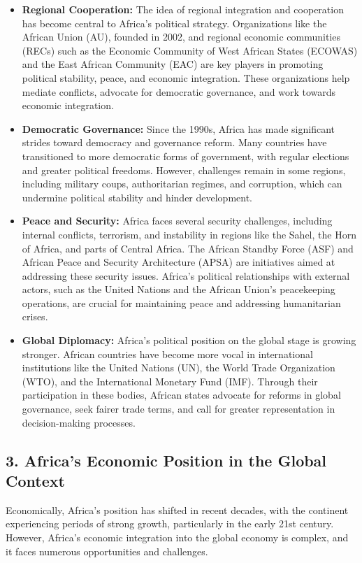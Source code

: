\documentclass[10pt]{article}
\begin{document}
\begin{itemize}
  \item \textbf{Regional Cooperation:} The idea of regional integration and cooperation has become
    central to Africa's political strategy. Organizations like the African Union (AU), founded in
    2002, and regional economic communities (RECs) such as the Economic Community of
    West African States (ECOWAS) and the East African Community (EAC) are key players in
    promoting political stability, peace, and economic integration. These organizations help
    mediate conflicts, advocate for democratic governance, and work towards economic
    integration.

  \item \textbf{Democratic Governance:} Since the 1990s, Africa has made significant strides toward
    democracy and governance reform. Many countries have transitioned to more
    democratic forms of government, with regular elections and greater political freedoms.
    However, challenges remain in some regions, including military coups, authoritarian
    regimes, and corruption, which can undermine political stability and hinder
    development.

  \item \textbf{Peace and Security:} Africa faces several security challenges, including internal conflicts,
    terrorism, and instability in regions like the Sahel, the Horn of Africa, and parts of Central
    Africa. The African Standby Force (ASF) and African Peace and Security Architecture
    (APSA) are initiatives aimed at addressing these security issues. Africa's political
    relationships with external actors, such as the United Nations and the African Union's
    peacekeeping operations, are crucial for maintaining peace and addressing humanitarian
    crises.

  \item \textbf{Global Diplomacy:} Africa's political position on the global stage is growing stronger.
    African countries have become more vocal in international institutions like the United
    Nations (UN), the World Trade Organization (WTO), and the International Monetary
    Fund (IMF). Through their participation in these bodies, African states advocate for
    reforms in global governance, seek fairer trade terms, and call for greater representation
    in decision-making processes.
\end{itemize}

\subsection*{3. Africa's Economic Position in the Global Context}
Economically, Africa's position has shifted in recent decades, with the continent experiencing
periods of strong growth, particularly in the early 21st century. However, Africa's economic
integration into the global economy is complex, and it faces numerous opportunities and
challenges.
\end{document}
